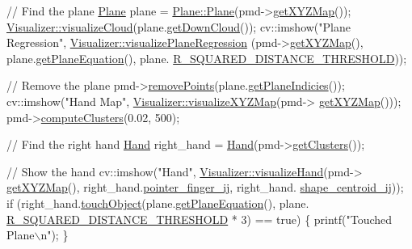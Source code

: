 \begin{DoxyCodeInclude}
        \textcolor{comment}{// Find the plane}
        \hyperlink{class_plane}{Plane} plane = \hyperlink{class_plane_a94bc1ca29c305edb76676528b1a9465c}{Plane::Plane}(pmd->\hyperlink{class_depth_camera_a0c295c5a0696550f453b1c8cd0fcb188}{getXYZMap}());
        \hyperlink{class_visualizer_af65e36aaef7c1f60d0f79819f17707d7}{Visualizer::visualizeCloud}(plane.\hyperlink{class_plane_abad6f7c26005ad7ab847af5acaad9c31}{getDownCloud}());
        cv::imshow(\textcolor{stringliteral}{"Plane Regression"}, \hyperlink{class_visualizer_a448063633391ee4ae2af595fe760aab0}{Visualizer::visualizePlaneRegression}
      (pmd->\hyperlink{class_depth_camera_a0c295c5a0696550f453b1c8cd0fcb188}{getXYZMap}(), plane.\hyperlink{class_plane_aafedb091ba358d46d5203c4e0eb6e838}{getPlaneEquation}(), plane.
      \hyperlink{class_plane_ae0e9b28377ab03e577aa6588da269328}{R\_SQUARED\_DISTANCE\_THRESHOLD}));
        
        \textcolor{comment}{// Remove the plane}
        pmd->\hyperlink{class_depth_camera_a8f38ced63dcfb0c4c56cb7d4e940bcd8}{removePoints}(plane.\hyperlink{class_plane_a843717e035e2e6b4e03a8eece14098b1}{getPlaneIndicies}());
        cv::imshow(\textcolor{stringliteral}{"Hand Map"}, \hyperlink{class_visualizer_a24caf117be9878e2f5ad35cabb7f4f88}{Visualizer::visualizeXYZMap}(pmd->
      \hyperlink{class_depth_camera_a0c295c5a0696550f453b1c8cd0fcb188}{getXYZMap}()));
        pmd->\hyperlink{class_depth_camera_a009719ec313de883b617903360bdf519}{computeClusters}(0.02, 500);
        
        \textcolor{comment}{// Find the right hand}
        \hyperlink{class_hand}{Hand} right\_hand = \hyperlink{class_hand}{Hand}(pmd->\hyperlink{class_depth_camera_a18d88b8df2a08c9c167207fea587d66e}{getClusters}());
        
        \textcolor{comment}{// Show the hand}
        cv::imshow(\textcolor{stringliteral}{"Hand"}, \hyperlink{class_visualizer_aa4436945eb7f9220b55d46914e8c5005}{Visualizer::visualizeHand}(pmd->
      \hyperlink{class_depth_camera_a0c295c5a0696550f453b1c8cd0fcb188}{getXYZMap}(), right\_hand.\hyperlink{class_hand_a7a7147d586c8fc8f781be0ed0dac1d94}{pointer\_finger\_ij}, right\_hand.
      \hyperlink{class_hand_a86d74ccce4bbfafa5825762713d38b44}{shape\_centroid\_ij}));
        \textcolor{keywordflow}{if} (right\_hand.\hyperlink{class_hand_aad89c3e47921cb0c39430f4501238088}{touchObject}(plane.\hyperlink{class_plane_aafedb091ba358d46d5203c4e0eb6e838}{getPlaneEquation}(), plane.
      \hyperlink{class_plane_ae0e9b28377ab03e577aa6588da269328}{R\_SQUARED\_DISTANCE\_THRESHOLD} * 3) == \textcolor{keyword}{true})
        \{
            printf(\textcolor{stringliteral}{"Touched Plane\(\backslash\)n"});
        \}
        


\end{DoxyCodeInclude}
